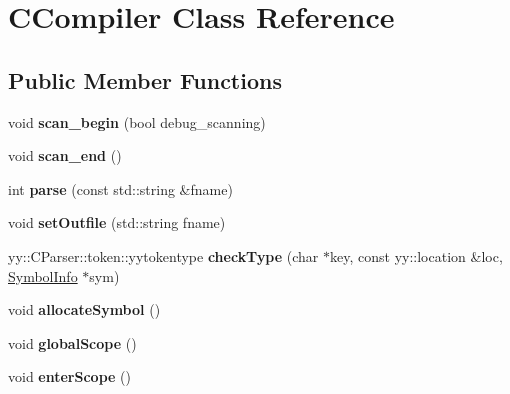 \hypertarget{classCCompiler}{\section{C\-Compiler Class Reference}
\label{classCCompiler}
}
\subsection*{Public Member Functions}
\begin{DoxyCompactItemize}
\item 
\hypertarget{classCCompiler_a52d92c3695f753176bfb14cbf544f398}{void {\bfseries scan\-\_\-begin} (bool debug\-\_\-scanning)}\label{classCCompiler_a52d92c3695f753176bfb14cbf544f398}

\item 
\hypertarget{classCCompiler_a304e3789eb84bfa2a2e2ef21f84abf12}{void {\bfseries scan\-\_\-end} ()}\label{classCCompiler_a304e3789eb84bfa2a2e2ef21f84abf12}

\item 
\hypertarget{classCCompiler_a8698733d7659aa1bc138b033a9b4d7fe}{int {\bfseries parse} (const std\-::string \&fname)}\label{classCCompiler_a8698733d7659aa1bc138b033a9b4d7fe}

\item 
\hypertarget{classCCompiler_a66089b35f2d1676f4a6639080a4177c0}{void {\bfseries set\-Outfile} (std\-::string fname)}\label{classCCompiler_a66089b35f2d1676f4a6639080a4177c0}

\item 
\hypertarget{classCCompiler_ae37bb9232064de17552090db6a2df97d}{yy\-::\-C\-Parser\-::token\-::yytokentype {\bfseries check\-Type} (char $\ast$key, const yy\-::location \&loc, \hyperlink{structSymbolInfo}{Symbol\-Info} $\ast$sym)}\label{classCCompiler_ae37bb9232064de17552090db6a2df97d}

\item 
\hypertarget{classCCompiler_adf3afdb8d707e764cabcafcb7ac3d66d}{void {\bfseries allocate\-Symbol} ()}\label{classCCompiler_adf3afdb8d707e764cabcafcb7ac3d66d}

\item 
\hypertarget{classCCompiler_a46e2be0b3d3bc44ecfe0b054e94676ba}{void {\bfseries global\-Scope} ()}\label{classCCompiler_a46e2be0b3d3bc44ecfe0b054e94676ba}

\item 
\hypertarget{classCCompiler_a907195dbe90c35f4aeec4be6616e3f34}{void {\bfseries enter\-Scope} ()}\label{classCCompiler_a907195dbe90c35f4aeec4be6616e3f34}


\end{DoxyCompactItemize}

